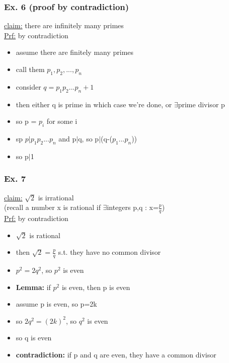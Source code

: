 \documentclass[a4paper]{article}
\newcommand{\te}{$\exists$}
\begin{document}
\begin{itemize}
      \subsubsection{Ex. 6 (proof by contradiction)}
        \underline{claim:} there are infinitely many primes\\
        \underline{Prf:} by contradiction
        \begin{itemize}
          \item assume there are finitely many primes
          \item call them $p_{1},p_2,...,p_{n}$
          \item consider $q=p_{1}p_2...p_{n}+1$
          \item then either q is prime in which case we're done, or \te prime
          divisor p
          \item so p = $p_{i}$ for some i
          \item sp $p|p_{1}p_2...p_{n}$ and p$|$q, so p$|$(q-($p_{1}...p_{n}$))
          \item so p$|$1
        \end{itemize}
      \subsubsection{Ex. 7}
        \underline{claim:} $\sqrt{2}$ is irrational\\
        (recall a number x is rational if \te integers p,q : x=$\frac{p}{q}$)\\
        \underline{Prf:} by contradiction
        \begin{itemize}
          \item $\sqrt{2}$ is rational
          \item then $\sqrt{2}= \frac{p}{q}$ s.t. they have no common divisor
          \item $p^2=2q^2$, so $p^2$ is even
          \item \textbf{Lemma:} if $p^2$ is even, then p is even
          \item assume p is even, so p=2k
          \item so $2q^2 = (2k)^2$, so $q^2$ is even
          \item so q is even
          \item \textbf{contradiction:} if p and q are even, they have a common
          divisor
        \end{itemize}

\end{itemize}
\end{document}
